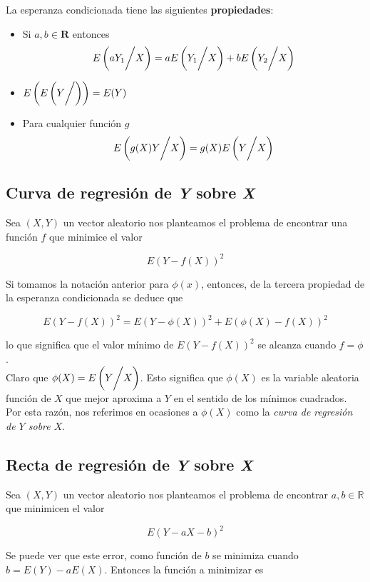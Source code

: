 La esperanza condicionada tiene las siguientes \textbf{propiedades}:
\begin{itemize}
    \item Si $a,b \in \mathbf{R}$ entonces
        \[ E\left( aY_1 \bigg{/} X \right) = aE\left( Y_1 \bigg{/} X \right) + bE\left( Y_2 \bigg{/} X \right) \]
    \item $E\left( E\left( Y \bigg{/} \right) \right) = E(Y)$
    \item Para cualquier función $g$
        \[ E\left( g(X)Y \bigg{/} X \right) = g(X)E\left( Y \bigg{/} X \right) \]
\end{itemize}

\newpage

\subsection{Curva de regresión de \textit{Y} sobre \textit{X}}

Sea $(X,Y)$ un vector aleatorio nos planteamos el problema de encontrar una función $f$ que minimice el valor

\[ E(Y - f(X))^2 \]

Si tomamos la notación anterior para $\phi(x)$, entonces, de la tercera propiedad de la esperanza condicionada se deduce que

\[ E(Y -f(X))^2 = E(Y - \phi(X))^2 + E(\phi(X) - f(X))^2 \]

lo que significa que el valor mínimo de $E(Y - f(X))^2$ se alcanza cuando $f = \phi$. \\
Claro que $\phi(X) = E\left( Y \bigg{/} X \right)$. Esto significa que $\phi(X)$ es la variable aleatoria función de $X$ que
mejor aproxima a $Y$ en el sentido de los mínimos cuadrados. Por esta razón, nos referimos en ocasiones a $\phi(X)$ como la
\textit{curva de regresión de $Y$ sobre $X$}. \\

\subsection{Recta de regresión de \textit{Y} sobre \textit{X}}

Sea $(X,Y)$ un vector aleatorio nos planteamos el problema de encontrar $a,b \in \mathbb{R}$ que minimicen el valor

\[ E(Y - aX - b)^2 \]

Se puede ver que este error, como función de $b$ se minimiza cuando $b = E(Y) - aE(X)$. Entonces la función a minimizar es

